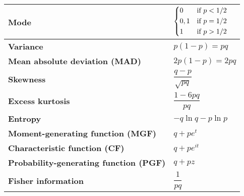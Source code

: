 \begin{customTableWrapper}{2}
\begin{longtable}{|m{6cm}|p{9cm}|}
    \textbf{Mode} & 
    ${ {\begin{dcases}0&{\text{if }}p<1/2\\0,1&{\text{if }}p=1/2\\1&{\text{if }}p>1/2\end{dcases}}}$
    \\ \hline

    \textbf{Variance} &
    ${ p(1-p)=pq}$
    \\ \hline

    \textbf{Mean absolute deviation (MAD)} &
    ${ 2p(1-p)=2pq}$
    \\[1ex] \hline

    \textbf{Skewness} &
    ${ {\dfrac {q-p}{\sqrt {pq}}}}$
    \\ \hline

    \textbf{Excess kurtosis} &
    ${ {\dfrac {1-6pq}{pq}}}$
    \\ \hline

    \textbf{Entropy} &
    ${ -q\ln q-p\ln p}$
    \\[1ex] \hline

    \textbf{Moment-generating function (MGF)} &
    ${ q+pe^{t}}$
    \\[1ex] \hline

    \textbf{Characteristic function (CF)} &
    ${ q+pe^{it}}$
    \\[1ex] \hline

    \textbf{Probability-generating function (PGF)} &
    ${ q+pz}$
    \\[1ex] \hline

    \textbf{Fisher information} &
    ${ {\dfrac {1}{pq}}}$
    \\[1ex] \hline


\end{longtable}
\end{customTableWrapper}























